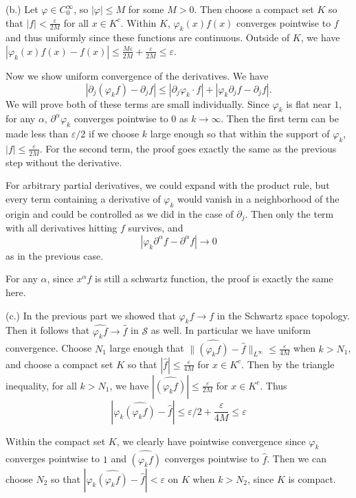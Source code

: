 \documentclass[11pt, reqno]{article}
\theoremstyle{plain}
\theoremstyle{definition}
\theoremstyle{remark}
\renewcommand{\phi}{\varphi}
\renewcommand{\epsilon}{\varepsilon}
\begin{document}
\begin{enumerate}
    (b.) Let $\phi \in C_0^\infty$, so $|\phi|\leq M$ for some $M > 0$. Then choose a compact set $K$ so that $|f| < \frac{\epsilon}{2M}$ for all $x \in K^c$. 
    Within $K$, $\phi_k(x)f(x)$ converges pointwise to $f$ and thus uniformly since these functions are continuous. Outside of $K$, we have
    $|\phi_k(x)f(x) - f(x)| \leq \frac{M\epsilon}{2M} + \frac{\epsilon}{2M} \leq \epsilon$.

    Now we show uniform convergence of the derivatives. We have
    \[  
        |\partial_j(\phi_k f) - \partial_j f| \leq |\partial_j \phi_k \cdot f| + |\phi_k \partial_j f - \partial_j f|.
    \]
    We will prove both of these terms are small individually. Since $\phi_k$ is flat near $1$, for any $\alpha$, $\partial^\alpha \phi_k$ converges pointwise to 0 
    as $k \to \infty$. Then the first term can be made less than $\epsilon/2$ if we choose $k$ large enough so that within the support of $\phi_k$, $|f| \leq \frac{\epsilon}{2M}$.
    For the second term, the proof goes exactly the same as the previous step without the derivative.

    For arbitrary partial derivatives, we could expand with the product rule, but every term containing a derivative of $\phi_k$ would vanish in a neighborhood of the origin
    and could be controlled as we did in the case of $\partial_j$. Then only the term with all derivatives hitting $f$ survives, and
    \[
        |\phi_k \partial^\alpha f - \partial^\alpha f| \to 0
    \]
    as in the previous case.

    For any $\alpha$, since $x^\alpha f$ is still a schwartz function, the proof is exactly the same here. 

    (c.) In the previous part we showed that $\phi_k f \to f$ in the Schwartz space topology. Then it follows that
    $\widehat{\phi_k f} \to \widehat{f}$ in $\mathscr{S}$ as well. In particular we have uniform convergence. 
    Choose $N_1$ large enough that $\|\widehat{(\phi_k f)} - \widehat{f}\|_{L^\infty} \leq \frac{\epsilon}{4M}$ when $k > N_1$, and
    choose a compact set $K$ so that $|\widehat{f}| \leq \frac{\epsilon}{4M}$ for $x \in K^c$. Then by 
    the triangle inequality, for all $k > N_1$, we have $|\widehat{(\phi_k f)}| \leq \frac{\epsilon}{2M}$ for $x \in K^c$. 
    Thus 
    \[
        |\phi_k\widehat{(\phi_k f)} - \widehat{f}| \leq \epsilon/2 + \frac{\epsilon}{4M} \leq \epsilon
    \]

    Within the compact set $K$, we clearly have pointwise convergence since $\phi_k$ converges pointwise to $1$ and
    $\widehat{(\phi_k f)}$ converges pointwise to $\widehat{f}$. Then we can choose $N_2$ so that $|\phi_k\widehat{(\phi_k f)} - \widehat{f}| < \epsilon$
    on $K$ when $k > N_2$, since $K$ is compact. 


\end{enumerate}
\end{document}

